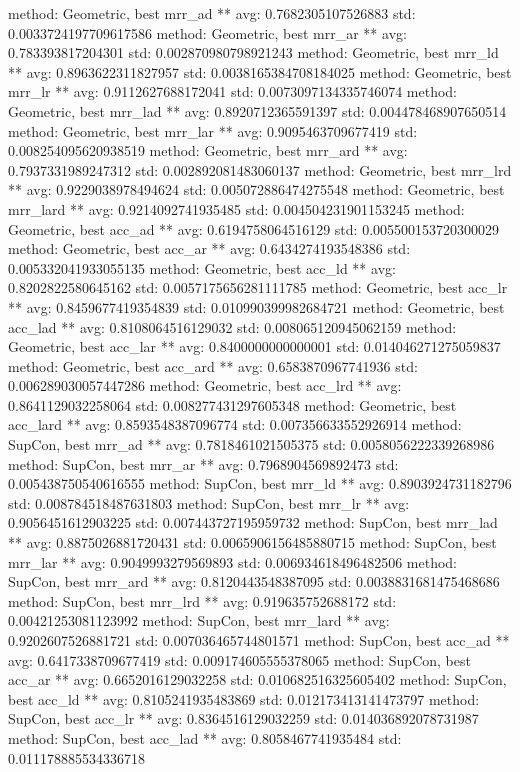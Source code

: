 method: Geometric, best mrr_ad ** avg: 0.7682305107526883 std: 0.0033724197709617586
method: Geometric, best mrr_ar ** avg: 0.783393817204301 std: 0.002870980798921243
method: Geometric, best mrr_ld ** avg: 0.8963622311827957 std: 0.0038165384708184025
method: Geometric, best mrr_lr ** avg: 0.9112627688172041 std: 0.0073097134335746074
method: Geometric, best mrr_lad ** avg: 0.8920712365591397 std: 0.004478468907650514
method: Geometric, best mrr_lar ** avg: 0.9095463709677419 std: 0.008254095620938519
method: Geometric, best mrr_ard ** avg: 0.7937331989247312 std: 0.002892081483060137
method: Geometric, best mrr_lrd ** avg: 0.9229038978494624 std: 0.005072886474275548
method: Geometric, best mrr_lard ** avg: 0.9214092741935485 std: 0.004504231901153245
method: Geometric, best acc_ad ** avg: 0.6194758064516129 std: 0.005500153720300029
method: Geometric, best acc_ar ** avg: 0.6434274193548386 std: 0.005332041933055135
method: Geometric, best acc_ld ** avg: 0.8202822580645162 std: 0.0057175656281111785
method: Geometric, best acc_lr ** avg: 0.8459677419354839 std: 0.010990399982684721
method: Geometric, best acc_lad ** avg: 0.8108064516129032 std: 0.008065120945062159
method: Geometric, best acc_lar ** avg: 0.8400000000000001 std: 0.014046271275059837
method: Geometric, best acc_ard ** avg: 0.6583870967741936 std: 0.006289030057447286
method: Geometric, best acc_lrd ** avg: 0.8641129032258064 std: 0.008277431297605348
method: Geometric, best acc_lard ** avg: 0.8593548387096774 std: 0.007356633552926914
method: SupCon, best mrr_ad ** avg: 0.7818461021505375 std: 0.0058056222339268986
method: SupCon, best mrr_ar ** avg: 0.7968904569892473 std: 0.005438750540616555
method: SupCon, best mrr_ld ** avg: 0.8903924731182796 std: 0.008784518487631803
method: SupCon, best mrr_lr ** avg: 0.9056451612903225 std: 0.007443727195959732
method: SupCon, best mrr_lad ** avg: 0.8875026881720431 std: 0.0065906156485880715
method: SupCon, best mrr_lar ** avg: 0.9049993279569893 std: 0.006934618496482506
method: SupCon, best mrr_ard ** avg: 0.8120443548387095 std: 0.0038831681475468686
method: SupCon, best mrr_lrd ** avg: 0.919635752688172 std: 0.00421253081123992
method: SupCon, best mrr_lard ** avg: 0.9202607526881721 std: 0.007036465744801571
method: SupCon, best acc_ad ** avg: 0.6417338709677419 std: 0.009174605555378065
method: SupCon, best acc_ar ** avg: 0.6652016129032258 std: 0.010682516325605402
method: SupCon, best acc_ld ** avg: 0.8105241935483869 std: 0.012173413141473797
method: SupCon, best acc_lr ** avg: 0.8364516129032259 std: 0.014036892078731987
method: SupCon, best acc_lad ** avg: 0.8058467741935484 std: 0.011178885534336718
